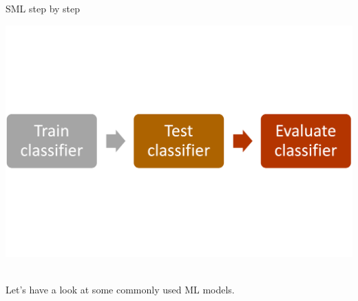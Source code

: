 \documentclass[handout]{beamer}
\begin{document}
	
	\begin{frame}{SML step by step}
		
		\begin{center}
			\includegraphics[width=\linewidth,height=\textheight,keepaspectratio]{../pictures/MLprocess.png} \\\
		\end{center}
	
		Let's have a look at some commonly used ML models.
		
		
		
		
		
		
		
		
		
		
		
	\end{frame}
	
\end{document}

